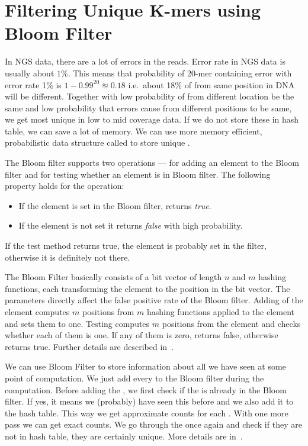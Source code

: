 \section{Filtering Unique K-mers using Bloom Filter}

In NGS data, there are a lot of errors in the reads. Error rate in NGS data is usually about $1\%$. This means that probability of 20-mer containing error with error rate 1\% is $1 - 0.99^{20} \approxeq 0.18$ i.e.\ about 18\% of \kmers from same position in DNA will be different. Together with low probability of \kmers from different location be the same and low probability that errors cause \kmers from different positions to be same, we get most \kmers unique in low to mid coverage data. If we do not store these \kmers in hash table, we can save a lot of memory. We can use more memory efficient, probabilistic data structure called \cite{bloomfilter} to store unique \kmers.

The Bloom filter supports two operations ---  for adding an element to the Bloom filter and  for testing whether an element is in Bloom filter. The following property holds for the  operation:
\begin{itemize}
  \item If the element is set in the Bloom filter, returns \emph{true}.
  \item If the element is not set it returns \emph{false} with high probability.
\end{itemize}
If the test method returns true, the element is probably set in the filter, otherwise it is definitely not there.

The Bloom Filter basically consists of a bit vector of length $n$ and $m$ hashing functions, each transforming the element to the position in the bit vector. The parameters directly affect the false positive rate of the Bloom filter.
Adding of the element computes $m$ positions from $m$ hashing functions applied to the element and sets them to one.
Testing computes $m$ positions from the element and checks whether each of them is one. If any of them is zero, returns false, otherwise returns true. Further details are described in~\cite{bloomfilter}.

We can use Bloom Filter to store information about all \kmers we have seen at some point of computation. We just add every \kmer to the Bloom filter during the computation. Before adding the \kmer, we first check if the \kmer is already in the Bloom filter. If yes, it means we (probably) have seen this \kmer before and we also add it to the hash table. This way we get approximate counts for each \kmer.
With one more pass we can get exact counts. We go through the \kmers once again and check if they are not in hash table, they are certainly unique. More details are in~\cite{bfcounter}.

